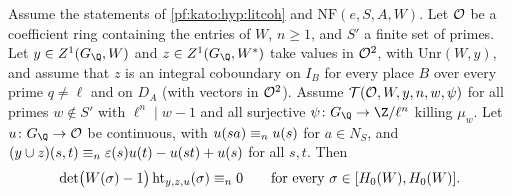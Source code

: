 \begin{theorem}\label{pf:kato:heights}
Assume the statements of \cref{pf:kato:hyp:litcoh} and $\mathrm{NF}(e,S,A,W)$. Let $\mathcal{O}$ be a coefficient ring containing the
entries of $W$, $n\ge1$, and $S'$ a finite set of primes. Let $y\in\katoZ(G_\Q,W)$ and $z\in\katoZ(G_\Q,W^*)$ take values in
$\mathcal{O}^2$, with $\mathrm{Unr}(W,y)$, and assume that $z$ is an integral coboundary on $I_B$ for every place $B$ over every prime
$q\ne\ell$ and on $D_A$ (with vectors in $\mathcal{O}^2$). Assume $\mathcal{T}(\mathcal{O},W,y,n,w,\psi)$ for all primes $w\notin S'$ with
$\ell^n\mid w-1$ and all surjective $\psi\colon G_\Q\to\Z/\ell^n$ killing $\mu_w$. Let $u\colon G_\Q\to\katoO$ be continuous, with
$u(sa)\equiv_{n}u(s)$ for $a\in N_S$, and $(y\cup z)(s,t)\equiv_{n}\varepsilon(s)u(t)-u(st)+u(s)$ for all $s,t$. Then
\[
  \det\bigl(W(\sigma)-1\bigr)\,\mathrm{ht}_{y,z,u}(\sigma)\equiv_{n}0\qquad\text{for every }\sigma\in[H_0(W),H_0(W)].
\]
\end{theorem}

